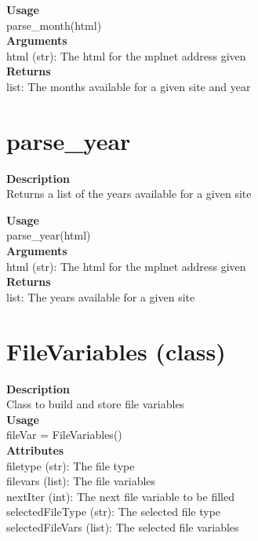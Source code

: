 \documentclass[11pt, oneside]{article}
\begin{document}
\noindent\textbf{Usage} \\
        parse\_month(html) \\

\noindent\textbf{Arguments} \\
        html (str): The html for the mplnet address given\\

\noindent\textbf{Returns} \\
        list: The months available for a given site and year\\

\section{parse\_year}

\textbf{Description} \\
        Returns a list of the years available for a given site

\noindent\textbf{Usage} \\
        parse\_year(html) \\

\noindent\textbf{Arguments} \\
        html (str): The html for the mplnet address given \\

\noindent\textbf{Returns} \\
        list: The years available for a given site \\

\newpage

\section{FileVariables (class)}

\textbf{Description} \\
        Class to build and store file variables\\

\noindent\textbf{Usage} \\
        fileVar = FileVariables() \\

\noindent\textbf{Attributes} \\
        filetype (str): The file type\\
        filevars (list): The file variables\\
        nextIter (int): The next file variable to be filled\\
        selectedFileType (str): The selected file type\\
        selectedFileVars (list): The selected file variables\\
\end{document}

